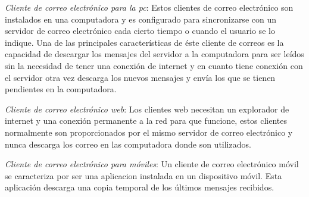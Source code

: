 \documentclass[12pt,oneside,onecolumn,openany]{report}
\begin{document}
\begin{itemize}
 \textit{Cliente de correo electrónico para la pc}:
Estos clientes de correo electrónico son instalados en una computadora y es configurado para sincronizarse con un servidor de correo electrónico cada cierto tiempo o cuando el usuario se lo indique. 
Una  de  las  principales  características  de  éste  cliente  de  correos  es  la  capacidad  de descargar los mensajes del servidor a la computadora para ser leídos sin la necesidad de tener  una  conexión  de  internet  y  en  cuanto  tiene  conexión  con  el  servidor  otra  vez 
descarga los nuevos mensajes y envía los que se tienen pendientes en la computadora. 

 \textit{Cliente de correo electrónico web}:
Los  clientes  web  necesitan  un  explorador  de  internet  y  una  conexión  permanente  a  la red  para  que  funcione,  estos  clientes  normalmente  son  proporcionados  por  el  mismo servidor de correo electrónico y nunca descarga los correo en las computadora donde son utilizados. 

 \textit{Cliente de correo electrónico para móviles}:
Un  cliente  de  correo electrónico  móvil  se  caracteriza  por  ser una  aplicacion  instalada  en  un dispositivo  móvil. Esta aplicación descarga una copia temporal de los últimos mensajes recibidos.  


\end{itemize}
\end{document}
